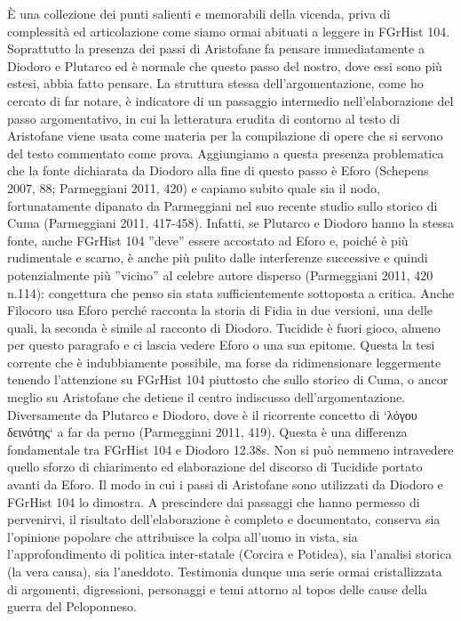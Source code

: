 {	È una collezione dei punti salienti e memorabili della vicenda, priva di complessità ed articolazione come siamo ormai abituati a leggere in FGrHist 104. Soprattutto la presenza dei passi di Aristofane  fa pensare immediatamente a  Diodoro e Plutarco ed è normale che questo passo del nostro, dove essi sono più estesi, abbia fatto pensare. La struttura stessa dell'argomentazione, come ho cercato di far notare, è indicatore di un passaggio intermedio nell'elaborazione del passo argomentativo, in cui la letteratura erudita di contorno al testo di Aristofane  viene usata come materia per la compilazione di opere che si servono del testo commentato come prova. Aggiungiamo a questa presenza problematica che la fonte dichiarata da  Diodoro alla fine di questo passo è Eforo (Schepens 2007, 88; Parmeggiani 2011, 420) e capiamo subito quale sia il nodo, fortunatamente dipanato da Parmeggiani nel suo recente studio sullo storico di Cuma (Parmeggiani 2011, 417-458). Infatti, se Plutarco e  Diodoro hanno la stessa fonte, anche FGrHist 104 ''deve'' essere accostato ad Eforo e, poiché è più rudimentale e scarno, è anche più pulito dalle interferenze successive e quindi potenzialmente più ''vicino'' al celebre autore disperso (Parmeggiani 2011, 420 n.114): congettura che penso sia stata sufficientemente sottoposta a critica. Anche Filocoro usa Eforo perché racconta la storia di Fidia in due versioni, una delle quali, la seconda è simile al racconto di Diodoro. Tucidide è fuori gioco, almeno per questo paragrafo e ci lascia vedere Eforo o una sua epitome. Questa la tesi corrente che è indubbiamente possibile, ma forse da ridimensionare leggermente tenendo l'attenzione su FGrHist 104 piuttosto che sullo storico di Cuma, o ancor meglio su Aristofane  che detiene il centro indiscusso dell'argomentazione. Diversamente da Plutarco e Diodoro, dove è il ricorrente concetto di `λόγου δεινότης` a far da perno (Parmeggiani 2011, 419). Questa è una differenza fondamentale tra FGrHist 104 e  Diodoro 12.38s. Non si può nemmeno intravedere quello sforzo di chiarimento ed elaborazione del discorso di Tucidide portato avanti da Eforo. Il modo in cui i passi di Aristofane sono utilizzati da Diodoro e FGrHist 104 lo dimostra. A prescindere dai passaggi che hanno permesso di pervenirvi, il risultato dell'elaborazione è completo e documentato, conserva sia l'opinione popolare che attribuisce la colpa all'uomo in vista, sia l'approfondimento di politica inter-statale (Corcira e Potidea), sia l'analisi storica (la vera causa), sia l'aneddoto. Testimonia dunque una serie ormai cristallizzata di argomenti, digressioni, personaggi e temi attorno al topos delle cause della guerra del Peloponneso. 
            
}
